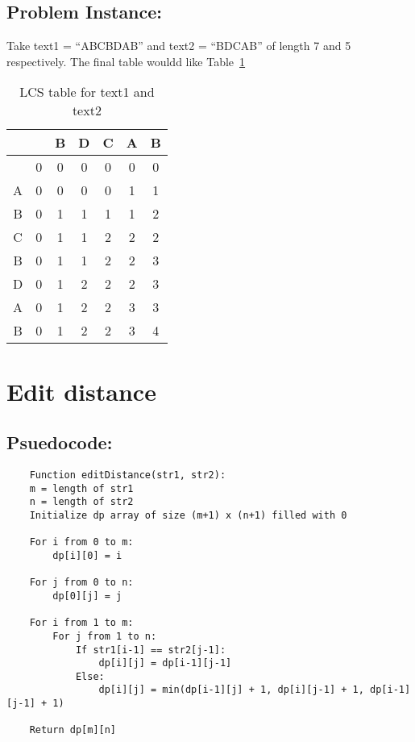\documentclass[10pt]{article}
\begin{document}
\subsection{Problem Instance:}
Take  text1 = ``ABCBDAB'' and text2 = ``BDCAB'' of length 7 and 5 respectively. 
The final table wouldd like Table~\ref{table1}
\begin{table}[h]
\centering
\begin{tabular}{c|c|c|c|c|c|c}
   &   & B & D & C & A & B \\ \hline
   & 0 & 0 & 0 & 0 & 0 & 0 \\ \hline
A  & 0 & 0 & 0 & 0 & 1 & 1 \\ \hline
B  & 0 & 1 & 1 & 1 & 1 & 2 \\ \hline
C  & 0 & 1 & 1 & 2 & 2 & 2 \\ \hline
B  & 0 & 1 & 1 & 2 & 2 & 3 \\ \hline
D  & 0 & 1 & 2 & 2 & 2 & 3 \\ \hline
A  & 0 & 1 & 2 & 2 & 3 & 3 \\ \hline
B  & 0 & 1 & 2 & 2 & 3 & 4 \\ 
\end{tabular}
\caption{LCS table for text1 and text2}\label{table1}
\end{table}

\section{Edit distance}
\subsection{Psuedocode:}
\begin{verbatim}
    Function editDistance(str1, str2):
    m = length of str1
    n = length of str2
    Initialize dp array of size (m+1) x (n+1) filled with 0
    
    For i from 0 to m:
        dp[i][0] = i
    
    For j from 0 to n:
        dp[0][j] = j
    
    For i from 1 to m:
        For j from 1 to n:
            If str1[i-1] == str2[j-1]:
                dp[i][j] = dp[i-1][j-1]
            Else:
                dp[i][j] = min(dp[i-1][j] + 1, dp[i][j-1] + 1, dp[i-1][j-1] + 1)
    
    Return dp[m][n]

\end{verbatim}
\end{document}
